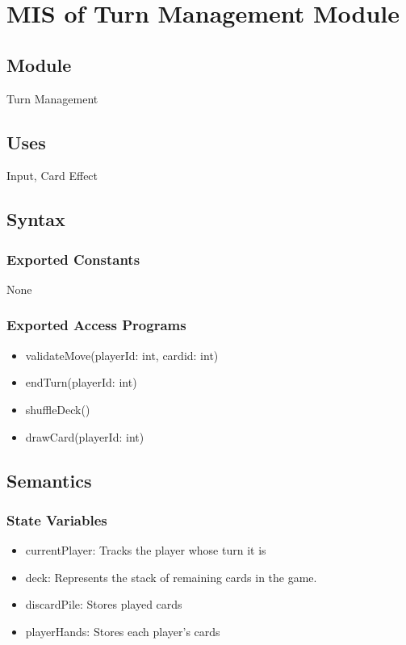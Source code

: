 \documentclass[12pt, titlepage]{article}
\begin{document}
\section{MIS of Turn Management Module} 

\subsection{Module}
\hspace{1.5em}Turn Management

\subsection{Uses}
\hspace{1.5em}Input, Card Effect

\subsection{Syntax}

\subsubsection{Exported Constants}
\hspace{1.5em}None

\subsubsection{Exported Access Programs}

\begin{itemize}
\item validateMove(playerId: int, cardid: int)
\item endTurn(playerId: int)
\item shuffleDeck()
\item drawCard(playerId: int)
\end{itemize}

\subsection{Semantics}

\subsubsection{State Variables}
\begin{itemize}
\item currentPlayer: Tracks the player whose turn it is
\item deck: Represents the stack of remaining cards in the game.
\item discardPile: Stores played cards
\item playerHands: Stores each player's cards
\end{itemize}
\end{document}
